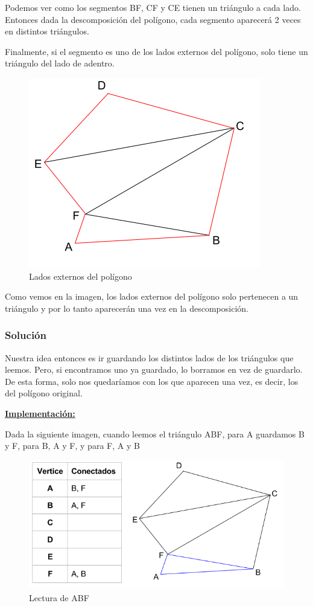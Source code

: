 Podemos ver como los segmentos BF, CF y CE tienen un triángulo a cada lado. Entonces dada la descomposición del polígono, cada segmento aparecerá 2 veces en distintos triángulos.

Finalmente, si el segmento es uno de los lados externos del polígono, solo tiene un triángulo del lado de adentro.
\begin{figure}[H]\centering\includegraphics[scale=0.5]{Imagenes/ej1/Imagen_C.png}\caption{Lados externos del polígono}\end{figure}

Como vemos en la imagen, los lados externos del polígono solo pertenecen a un triángulo y por lo tanto aparecerán una vez en la descomposición.

\subsubsection{Solución}
Nuestra idea entonces es ir guardando los distintos lados de los triángulos que leemos. Pero, si encontramos uno ya guardado, lo borramos en vez de guardarlo. De esta forma, solo nos quedaríamos con los que aparecen una vez, es decir, los del polígono original.

\underline{\textbf{Implementación:}}


Dada la siguiente imagen, cuando leemos el triángulo ABF, para A guardamos B y F, para B, A y F, y para F, A y B
\begin{figure}[H]\centering\includegraphics[scale=0.7]{Imagenes/ej1/Imagen_D.png}\caption{Lectura de ABF}\end{figure}

